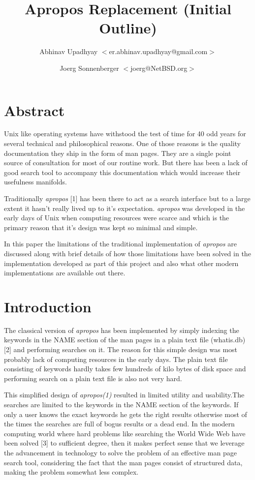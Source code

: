 \documentclass[titlepage, a4paper, 12pt]{article}
\title{Apropos Replacement \newline
(Initial Outline)}
\author{Abhinav Upadhyay $<$er.abhinav.upadhyay@gmail.com$>$ \and 
Joerg Sonnenberger $<$joerg@NetBSD.org$>$}
\begin{document}
\maketitle
\section{Abstract}
Unix like operating systems have withstood the test of time for 40 odd years for
several technical and philosophical reasons. One of those reasons is the
quality documentation they ship in the form of man pages. They are a single point
source of consultation for most of our routine work. But there has been a lack of
good search tool to accompany this documentation which would increase their
usefulness manifolds.

Traditionally \textit{apropos} [1] has been there to act as a search
interface but to a large extent it hasn't really lived up to it's expectation.
\textit{apropos} was
developed in the early days of Unix when computing resources were scarce and
which is the primary reason that it's design was kept so
minimal and simple.

In this paper the limitations of the traditional implementation of
\textit{apropos} are discussed along with brief details of how those limitations
have been solved in the implementation developed as part of this project and also
what other modern implementations are available out there.
\section{Introduction}
The classical version of \textit{apropos} has been implemented by simply
indexing the keywords in the NAME section of the man pages in a plain text file
(whatis.db) [2]
and performing searches on it. The reason for this simple design was most
probably lack of computing resources in the early days. The plain text file
consisting of keywords hardly takes few hundreds of kilo bytes of disk space
and performing search on a plain text file is also not very hard.

This simplified design of \textit{apropos(1)} resulted in limited utility and
usability.The searches are limited to the keywords in the NAME section of the
 keywords. If
only a user knows the exact keywords he gets the right results otherwise most of
the times the searches are full of bogus results or a dead end. In the modern
computing world where hard problems like searching the World Wide Web have been
solved [3] to sufficient degree, then it makes perfect sense that we leverage the advancement in technology to solve the problem of an effective man page
search tool, considering the fact that the man
pages consist of structured data, making the problem somewhat less complex.
\end{document}
